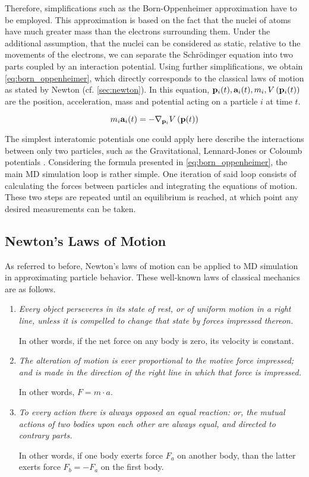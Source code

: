 Therefore, simplifications such as the Born-Oppenheimer approximation have to be employed. This approximation is based on the fact that the nuclei of atoms have much greater mass than the electrons surrounding them. Under the additional assumption, that the nuclei can be considered as static, relative to the movements of the electrons, we can separate the Schrödinger equation into two parts coupled by an interaction potential. Using further simplifications, we obtain \eqref{eq:born_oppenheimer}, which directly corresponds to the classical laws of motion as stated by Newton (cf. \autoref{sec:newton}). In this equation, $\mathbf{p}_i(t), \mathbf{a}_i(t), m_i, V\left(\mathbf{p}_i(t)\right)$ are the position, acceleration, mass and potential acting on a particle $i$ at time $t$. \cite{Born1927, Voorhis2005, Griebel2007} 

\begin{equation}
	m_i\mathbf{a}_i(t) = -\nabla_{\mathbf{p}_i} V\left(\mathbf{p}(t)\right)\label{eq:born_oppenheimer}
\end{equation}

The simplest interatomic potentials one could apply here describe the interactions between only two particles, such as the Gravitational, Lennard-Jones or Coloumb potentials \cite{Griebel2007}.
Considering the formula presented in \eqref{eq:born_oppenheimer}, the main MD simulation loop is rather simple. One iteration of said loop consists of calculating the forces between particles and integrating the equations of motion. These two steps are repeated until an equilibrium is reached, at which point any desired measurements can be taken. \cite{Frenkel2002}





\subsection{Newton's Laws of Motion}
\label{sec:newton}
As referred to before, Newton's laws of motion can be applied to MD simulation in approximating particle behavior. These well-known laws of classical mechanics are as follows. \cite{Newton1934}
\begin{enumerate}[label=\Roman*.]
	\item \textit{Every object perseveres in its state of rest, or of uniform motion in a right line, unless it is compelled to change that state by forces impressed thereon.}

	      In other words, if the net force on any body is zero, its velocity is constant.
	\item \textit{The alteration of motion is ever proportional to the motive force impressed; and is made in the direction of the right line in which that force is impressed.}

	      In other words, $F=m\cdot a$.
	\item \textit{To every action there is always opposed an equal reaction: or, the mutual actions of two bodies upon each other are always equal, and directed to contrary parts.}

	      In other words, if one body exerts force $F_a$ on another body, than the latter exerts force $F_b=-F_a$ on the first body.
\end{enumerate}

